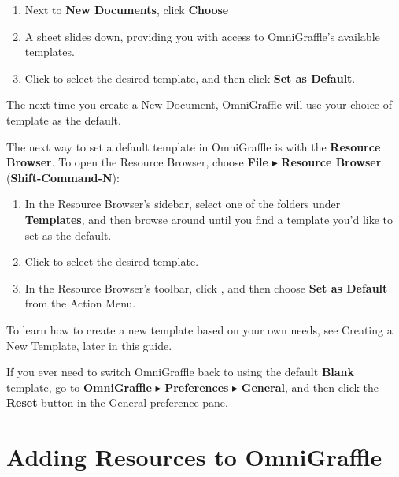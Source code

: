 \documentclass[../main.tex]{subfiles}
\begin{document}
\begin{enumerate}
  \item Next to \textbf{New Documents}, click \textbf{Choose}
  \item A sheet slides down, providing you with access to OmniGraffle's available templates.
  \item Click to select the desired template, and then click \textbf{Set as Default}.
\end{enumerate}


The next time you create a New Document, OmniGraffle will use your choice of template as the
default.

The next way to set a default template in OmniGraffle is with the \textbf{Resource Browser}. To
open the Resource Browser, choose \textbf{File} $\blacktriangleright$ \textbf{Resource
Browser} (\textbf{Shift-Command-N}):


\begin{enumerate}
  \item In the Resource Browser's sidebar, select one of the folders under \textbf{Templates},
    and then browse around until you find a template you'd like to set as the default.
  \item Click to select the desired template.
  \item In the Resource Browser's toolbar, click
    , and then choose \textbf{Set as Default}
    from the Action Menu.
\end{enumerate}


\begin{ognote}
  To learn how to create a new template based on your own needs, see Creating a New Template,
  later in this guide.
\end{ognote}

If you ever need to switch OmniGraffle back to using the default \textbf{Blank} template, go to
\textbf{OmniGraffle} $\blacktriangleright$ \textbf{Preferences} $\blacktriangleright$
\textbf{General}, and then click the \textbf{Reset} button in the General preference pane.

\section{Adding Resources to OmniGraffle}
\end{document}
